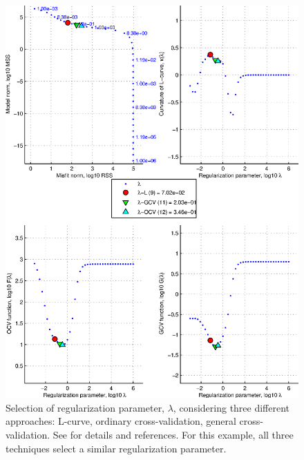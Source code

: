 \documentclass[11pt,titlepage,fleqn]{article}
\begin{document}
\begin{figure}
\includegraphics[width=16cm]{fig1D_4.eps}
\caption[]
{{
Selection of regularization parameter, $\lambda$, considering three different approaches: L-curve, ordinary cross-validation, general cross-validation. See \citet{Tape2009gps} for details and references. For this example, all three techniques select a similar regularization parameter.
\label{fig:1D_4}
}}
\end{figure}
\end{document}
